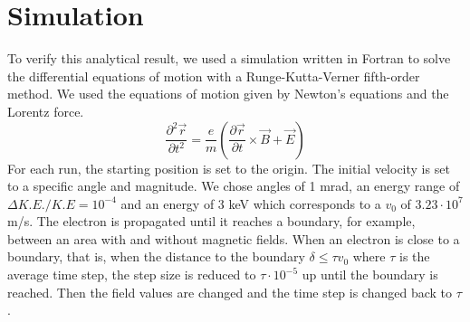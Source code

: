 \documentclass[12pt,letterpaper]{article}
\newcommand{\pdt}[1]{\frac{\partial #1}{\partial t}}
\newcommand{\ee}[1]{\cdot10^{#1}}
\newcommand{\dv}{\Delta v}
\newcommand{\dy}{\Delta y}
\begin{document}
\section{Simulation}

To verify this analytical result, we used a simulation written in Fortran to solve the differential equations of motion with a Runge-Kutta-Verner fifth-order method. 
We used the equations of motion given by Newton's equations and the Lorentz force.
\[
\frac{\partial^2\vec{r}}{\partial t^2} = \frac{e}{m}\left( \pdt{\vec{r}} \times \vec B + \vec E\right)
\]
For each run, the starting position is set to the origin. 
The initial velocity is set to a specific angle and magnitude. 
We chose angles of 1 mrad, an energy range of $\Delta K.E./ K.E=10^{-4}$ and an energy of 3 keV which corresponds to a $v_0$ of $3.23\ee{7}$ m/s.
The electron is propagated until it reaches a boundary, for example, between an area with and without magnetic fields. When an electron is close to a boundary, that is, when the distance to the boundary $\delta\le\tau v_0$ where $\tau$ is the average time step, the step size is reduced to $\tau\ee{-5}$ up until the boundary is reached. 
Then the field values are changed and the time step is changed back to $\tau$. 
\end{document}
